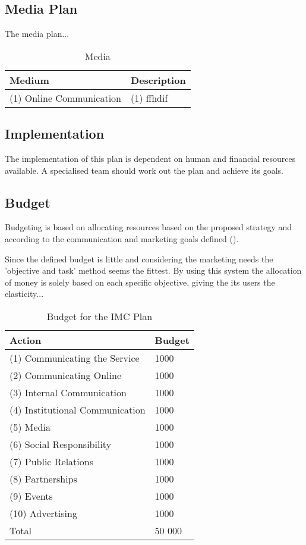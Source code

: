\documentclass[12pt]{article}
\begin{document}
\subsection{Media Plan}
The media plan...
\begin{table}[htbp]
\small
\caption{Media}
\label{table:media}
\centering
\begin{tabular}{ @{}P{0.2\textwidth}P{0.7\textwidth}@{} }
Medium	&	Description	\\ \hline
 (1) Online Communication	&	(1) ffhdif \\
\end{tabular}
\end{table}


\subsection{Implementation}
The implementation of this plan is dependent on human and financial resources available. A specialised team should work out the plan and achieve its goals.

\subsection{Budget}

Budgeting is based on allocating resources based on the proposed strategy and according to the communication and marketing goals defined (\cite{clow}). 

Since the defined budget is little and considering the marketing needs the 'objective and task' method seems the fittest. By using this system the allocation of money is solely based on each specific objective, giving the its users the elasticity...

\begin{table}[htb]
\small
\caption{Budget for the IMC Plan}
\label{table:budget}
\centering
\begin{tabular}{ @{}P{0.4\textwidth}P{0.2\textwidth}@{} }
Action	&	Budget	\\ \hline
  (1) Communicating the Service & 1000 \\
  (2) Communicating Online & 1000 \\
  (3) Internal Communication & 1000 \\
  (4) Institutional Communication & 1000 \\
  (5) Media & 1000 \\
  (6) Social Responsibility & 1000 \\
  (7) Public Relations & 1000 \\
  (8) Partnerships & 1000 \\
  (9) Events & 1000 \\
  (10) Advertising & 1000 \\
  \hline
  Total & 50 000 \\
\end{tabular}
\end{table}
\end{document}
